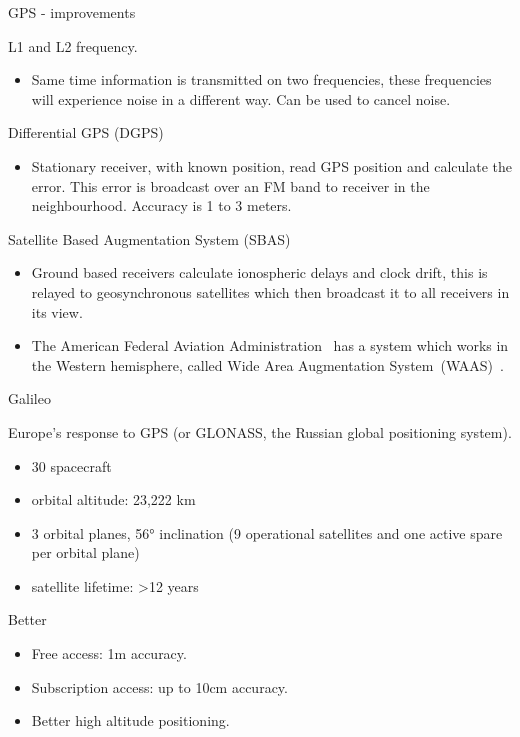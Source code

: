 \documentclass[compress]{beamer}
\providecommand{\tightlist}{%
  \setlength{\itemsep}{0pt}\setlength{\parskip}{0pt}}
\begin{document}
\begin{frame}{GPS - improvements}

L1 and L2 frequency.

\begin{itemize}
\tightlist
\item
  Same time information is transmitted on two frequencies, these
  frequencies will experience noise in a different way. Can be used to
  cancel noise.
\end{itemize}

Differential GPS (DGPS)

\begin{itemize}
\tightlist
\item
  Stationary receiver, with known position, read GPS position and
  calculate the error. This error is broadcast over an FM band to
  receiver in the neighbourhood. Accuracy is 1 to 3 meters.
\end{itemize}

Satellite Based Augmentation System (SBAS)

\begin{itemize}
\tightlist
\item
  Ground based receivers calculate ionospheric delays and clock drift,
  this is relayed to geosynchronous satellites which then broadcast it
  to all receivers in its view.
\item
  The American Federal Aviation Administration~ has a system which works
  in the Western hemisphere, called Wide Area Augmentation
  System~(WAAS)~.
\end{itemize}

\end{frame}

\begin{frame}{Galileo}

Europe's response to GPS (or GLONASS, the Russian global positioning
system).

\begin{itemize}
\tightlist
\item
  30 spacecraft
\item
  orbital altitude: 23,222 km
\item
  3 orbital planes, 56° inclination (9 operational satellites and one
  active spare per orbital plane)
\item
  satellite lifetime: \textgreater{}12 years
\end{itemize}

Better

\begin{itemize}
\tightlist
\item
  Free access: 1m accuracy.
\item
  Subscription access: up to 10cm accuracy.
\item
  Better high altitude positioning.
\end{itemize}

\end{frame}
\end{document}
